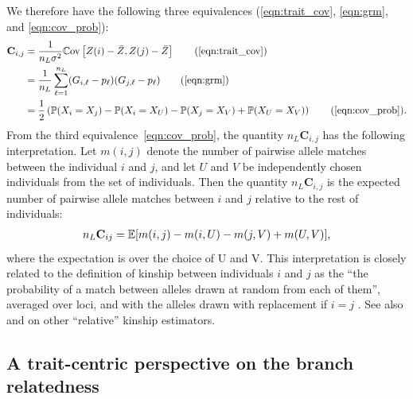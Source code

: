 We therefore have the following three equivalences
(\ref{eqn:trait_cov}, \ref{eqn:grm}, and \ref{eqn:cov_prob}):
%
\begin{align} \label{eqn:equivalence}
    \mathbf{C}_{i,j} &= \frac{1}{n_L \sigma^2}\Cov\left[Z(i) - \bar{Z}, Z(j) - \bar{Z}\right] \tag{\ref{eqn:trait_cov}} \\
                     &= \frac{1}{n_L}\sum_{\ell=1}^{n_L} (G_{i,\ell} - p_\ell)(G_{j,\ell} - p_\ell) \tag{\ref{eqn:grm}} \\
                     &= \frac{1}{2}\left(\P(X_i = X_j) - \P(X_i = X_U) - \P(X_j = X_V) + \P(X_U = X_V) \right) \tag{\ref{eqn:cov_prob}}.
\end{align}
%
From the third equivalence~\eqref{eqn:cov_prob},
the quantity $n_L\mathbf{C}_{i,j}$ has the following interpretation.
%
Let $m(i,j)$ denote the number of pairwise allele matches between
the individual $i$ and $j$,
and let $U$ and $V$ be independently chosen individuals from the set of individuals.
%
Then the quantity $n_L\mathbf{C}_{i,j}$
is the expected number of pairwise allele matches between $i$ and $j$
relative to the rest of individuals:
%
\begin{align} \label{eqn:relative_allele_matches}
    n_L \mathbf{C}_{ij} = \mathbb{E}[m(i,j) - m(i,U) - m(j,V) + m(U,V)],
\end{align}
%
where the expectation is over the choice of U and V.
%
This interpretation is closely related to the definition of kinship
between individuals $i$ and $j$ as the
``the probability of a match between alleles drawn at random from each of them'',
averaged over loci, and with the alleles drawn with replacement if $i=j$
\citep{malecot1969mathemathics, speed2015relatedness}.
%
See also \citet{weir2017unified, weir2018how} and \citet{ochoa2021estimating} on
other ``relative'' kinship estimators.


\subsection{A trait-centric perspective on the branch relatedness} \label{sec:trait-centric}


